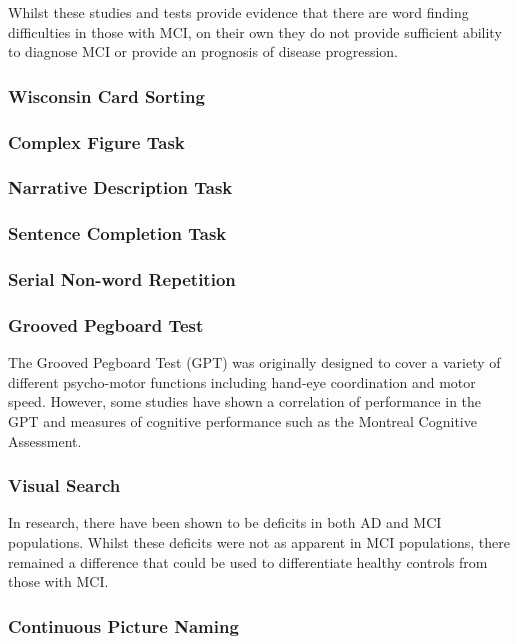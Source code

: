 \documentclass{article}
\begin{document}
Whilst these studies and tests provide evidence that there are word finding difficulties in those with MCI, on their own they do not provide sufficient ability to diagnose MCI or provide an prognosis of disease progression.
\subsubsection{Wisconsin Card Sorting}
\subsubsection{Complex Figure Task}
\subsubsection{Narrative Description Task}
\subsubsection{Sentence Completion Task}
\subsubsection{Serial Non-word Repetition}
\subsubsection{Grooved Pegboard Test}
The Grooved Pegboard Test (GPT) was originally designed to cover a variety of different psycho-motor functions including hand-eye coordination and motor speed. However, some studies have shown a correlation of performance in the GPT and measures of cognitive performance such as the Montreal Cognitive Assessment.  
\subsubsection{Visual Search}
In research, there have been shown to be deficits in both AD and MCI populations. Whilst these deficits were not as apparent in MCI populations, there remained a difference that could be used to differentiate healthy controls from those with MCI.

\subsubsection{Continuous Picture Naming}
\end{document}
